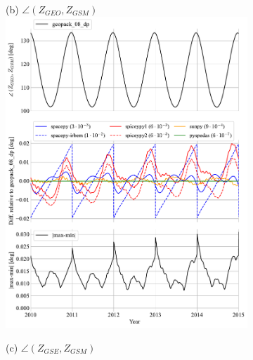 \documentclass[draft]{agujournal2019}
\begin{document}
\begin{figure}[htb]
\begin{subfigure}[b]{0.49\textwidth}
     \end{subfigure}
     \begin{subfigure}[b]{0.49\textwidth}
         (b) $\angle (Z_{GEO}, Z_{GSM})$
         \centering
         \includegraphics[width=\textwidth]{code/figures/angles/delta=1days_20100101-20150101/GEO_GSM.pdf}
     \end{subfigure}
     \par\bigskip\bigskip
     \begin{subfigure}[b]{0.49\textwidth}
         (c) $\angle (Z_{GSE}, Z_{GSM})$
         \centering

\end{subfigure}
\end{figure}
\end{document}
